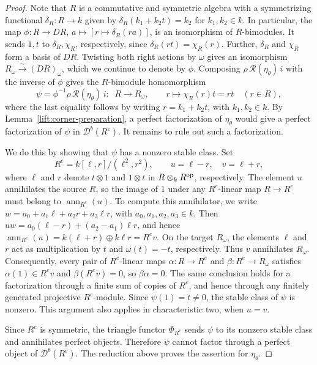 \documentclass[11pt]{article}
\begin{document}
\begin{proof}
Note that $R$ is a commutative and symmetric algebra with a symmetrizing functional
$\delta_R:R\to k$ given by $\delta_R(k_1+k_2 t)=k_2$ for $k_1, k_2\in k$.
In particular, the map $\phi: R\to DR$, $a\mapsto[r\mapsto\delta_R(ra)]$, is an isomorphism of $R$-bimodules. It sends $1,t$ to $\delta_R, \chi_R$, respectively, since $\delta_R(rt)=\chi_R(r)$.
Further, $\delta_R$ and $\chi_R$ form a basis of $DR$. Twisting both right actions by $\omega$ gives
an isomorphism $R_\omega\xrightarrow{\sim}(DR)_\omega$, which we continue to denote by $\phi$.
Composing $\rho\,\mathcal R(\eta_\theta)\,i$ with the inverse of
$\phi$ gives the $R$-bimodule homomorphism
\[
 \psi=\phi^{-1}\rho\,\mathcal R(\eta_\theta)\,i:\;\; R\longrightarrow R_\omega,\qquad
 r\mapsto \chi_R(r)t=rt\quad(r\in R),
\]
where the last equality follows by writing $r=k_1+k_2 t$, with $k_1, k_2\in k$.
By Lemma~\ref{lift:corner-preparation}, a perfect factorization
of $\eta_\theta$ would give a perfect factorization of $\psi$ in
$\mathscr D^b(R^e)$. It remains to rule out such a factorization.

We do this by showing that $\psi$ has a nonzero stable class. Set
\[
 R^e=k[\ell,r]/(\ell^2,r^2),\qquad
 u=\ell-r,\quad v=\ell+r,
\]
where $\ell$ and $r$ denote $t\otimes1$ and $1\otimes t$ in $R\otimes_k R^{\rm op}$, respectively.
The element $u$ annihilates the source $R$, so the image of $1$
under any $R^e$-linear map $R\to R^e$ must belong to
$\operatorname{ann}_{R^e}(u)$.
To compute this annihilator, we write
$w=a_0+a_1\ell+a_2r+a_3\ell r$, with $a_0,a_1,a_2,a_3\in k$.
Then $uw=a_0(\ell-r)+(a_2-a_1)\ell r$, and hence
$\operatorname{ann}_{R^e}(u)=k(\ell+r)\oplus k\ell r=R^ev$.
On the target $R_\omega$, the elements $\ell$ and $r$ act as
multiplication by $t$ and $\omega(t)=-t$, respectively. Thus $v$
annihilates $R_\omega$.
Consequently, every pair of $R^e$-linear maps
$\alpha:R\to R^e$ and $\beta:R^e\to R_\omega$ satisfies
$\alpha(1)\in R^ev$ and $\beta(R^ev)=0$, so $\beta\alpha=0$.
The same conclusion holds for a factorization through a finite sum
of copies of $R^e$, and hence through any finitely generated
projective $R^e$-module.
Since $\psi(1)=t\ne0$, the stable class of $\psi$ is nonzero.
This argument also applies in characteristic two, when $u=v$.

Since $R^e$ is symmetric, the triangle functor $\Phi_{R^e}$
sends $\psi$ to its nonzero stable class and annihilates perfect objects. Therefore $\psi$ cannot factor through a perfect object of $\mathscr D^b(R^e)$.
The reduction above proves the assertion for $\eta_\theta$.
\end{proof}
\end{document}
